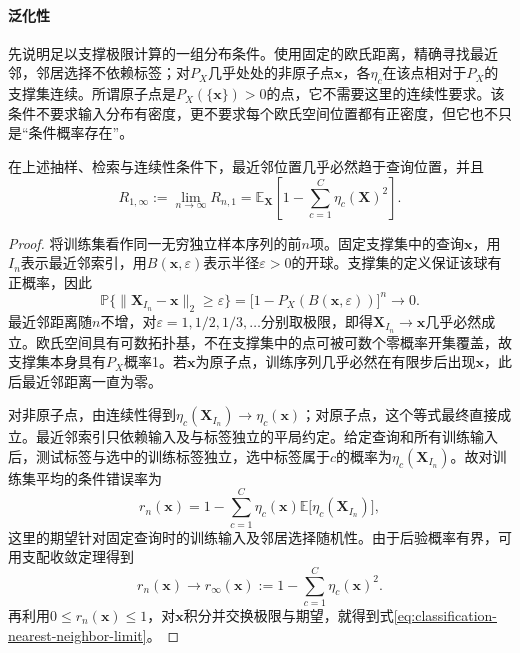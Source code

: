 \paragraph{泛化性}
先说明足以支撑极限计算的一组分布条件。使用固定的欧氏距离，精确寻找最近邻，邻居选择不依赖标签；对$P_X$几乎处处的非原子点$\bm{x}$，各$\eta_c$在该点相对于$P_X$的支撑集连续。所谓原子点是$P_X(\{\bm{x}\})>0$的点，它不需要这里的连续性要求。该条件不要求输入分布有密度，更不要求每个欧氏空间位置都有正密度，但它也不只是“条件概率存在”。

\begin{lemma}[最近邻风险的极限]
  \label{lem:classification-nearest-neighbor-limit}
  在上述抽样、检索与连续性条件下，最近邻位置几乎必然趋于查询位置，并且
  \begin{equation}
    R_{1,\infty}:=\lim_{n\to\infty}R_{n,1}
    =\mathbb{E}_{\bm{X}}\left[
      1-\sum_{c=1}^{C}\eta_c(\bm{X})^2
    \right].
    \label{eq:classification-nearest-neighbor-limit}
  \end{equation}
\end{lemma}

\begin{proof}
  将训练集看作同一无穷独立样本序列的前$n$项。固定支撑集中的查询$\bm{x}$，用$I_n$表示最近邻索引，用$B(\bm{x},\varepsilon)$表示半径$\varepsilon>0$的开球。支撑集的定义保证该球有正概率，因此
  \[
    \mathbb{P}\{\|\bm{X}_{I_n}-\bm{x}\|_2\geq\varepsilon\}
    =\bigl[1-P_X(B(\bm{x},\varepsilon))\bigr]^n
    \longrightarrow0.
  \]
  最近邻距离随$n$不增，对$\varepsilon=1,1/2,1/3,\ldots$分别取极限，即得$\bm{X}_{I_n}\to\bm{x}$几乎必然成立。欧氏空间具有可数拓扑基，不在支撑集中的点可被可数个零概率开集覆盖，故支撑集本身具有$P_X$概率1。若$\bm{x}$为原子点，训练序列几乎必然在有限步后出现$\bm{x}$，此后最近邻距离一直为零。

  对非原子点，由连续性得到$\eta_c(\bm{X}_{I_n})\to\eta_c(\bm{x})$；对原子点，这个等式最终直接成立。最近邻索引只依赖输入及与标签独立的平局约定。给定查询和所有训练输入后，测试标签与选中的训练标签独立，选中标签属于$c$的概率为$\eta_c(\bm{X}_{I_n})$。故对训练集平均的条件错误率为
  \[
    r_n(\bm{x})
    =1-\sum_{c=1}^{C}\eta_c(\bm{x})
       \mathbb{E}\bigl[\eta_c(\bm{X}_{I_n})\bigr],
  \]
  这里的期望针对固定查询时的训练输入及邻居选择随机性。由于后验概率有界，可用支配收敛定理得到
  \[
    r_n(\bm{x})\longrightarrow
    r_\infty(\bm{x})
    :=1-\sum_{c=1}^{C}\eta_c(\bm{x})^2.
  \]
  再利用$0\leq r_n(\bm{x})\leq1$，对$\bm{x}$积分并交换极限与期望，就得到式\eqref{eq:classification-nearest-neighbor-limit}。
\end{proof}

